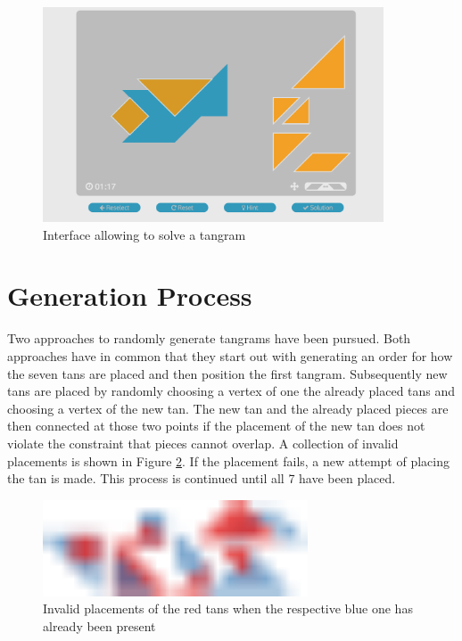 \begin{figure}
\centering
    \includegraphics[width=0.9\textwidth]{figures/game.png}
  \caption{Interface allowing to solve a tangram}  
  \label{game}
\end{figure}

\section{Generation Process}
\label{generate}

Two approaches to randomly generate tangrams have been pursued. Both approaches have in common that they start out with generating an order for how the seven tans are placed and then position the first tangram. Subsequently new tans are placed by randomly choosing a vertex of one the already placed tans and choosing a vertex of the new tan. The new tan and the already placed pieces are then connected at those two points if the placement of the new tan does not violate the constraint that pieces cannot overlap. A collection of invalid placements is shown in Figure \ref{overlap}. If the placement fails, a new attempt of placing the tan is made. This process is continued until all 7 have been placed. 

\begin{figure}
\centering
    \includegraphics[width=0.7\textwidth]{figures/overlap.pdf}
  \caption{Invalid placements of the red tans when the respective blue one has already been present}  
  \label{overlap}
\end{figure}

